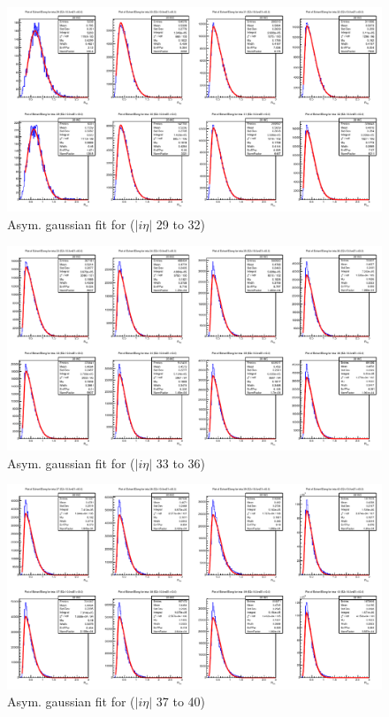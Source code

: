 \begin{figure}[h]
\centering
\includegraphics[width=\linewidth]{../Figures/Chap2/ImageFiles_HF/Ratio/Ratioieta29to32.pdf}
\caption{Asym. gaussian fit for \ratiosl ($|i\eta|$ 29 to 32)}
\label{fig:Ratioieta29to32}
\end{figure}
\begin{figure}[h]
\centering
\includegraphics[width=\linewidth]{../Figures/Chap2/ImageFiles_HF/Ratio/Ratioieta33to36.pdf}
\caption{Asym. gaussian fit for \ratiosl ($|i\eta|$ 33 to 36)}
\label{fig:Ratioieta33to36}
\end{figure}
\begin{figure}[h]
\centering
\includegraphics[width=\linewidth]{../Figures/Chap2/ImageFiles_HF/Ratio/Ratioieta37to40.pdf}
\caption{Asym. gaussian fit for \ratiosl ($|i\eta|$ 37 to 40)}
\label{fig:Ratioieta37to40}
\end{figure}
